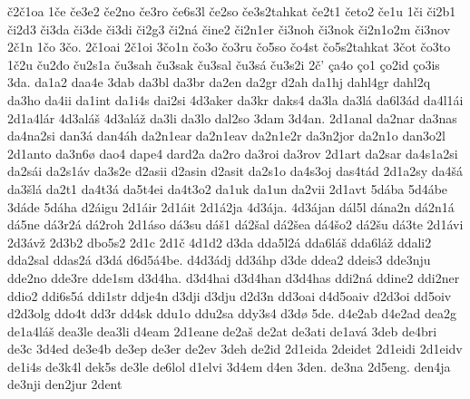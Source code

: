 {    č2č1oa
    1če
    če3e2
    če2no
    če3ro
    če6s3l
    če2so
    če3s2tahkat
    če2t1
    četo2
    če1u
    1či
    či2b1
    či2d3
    či3da
    či3de
    či3di
    či2g3
    či2ná
    čine2
    či2n1er
    či3noh
    či3nok
    či2n1o2m
    či3nov
    2č1n
    1čo
    3čo.
    2č1oai
    2č1oi
    3čo1n
    čo3o
    čo3ru
    čo5so
    čo4st
    čo5s2tahkat
    3čot
    čo3to
    1č2u
    ču2đo
    ču2s1a
    ču3sah
    ču3sak
    ču3sal
    ču3sá
    ču3s2i
    2č'
    ça4o
    ço1
    ço2id
    ço3is
    3da.
    da1a2
    daa4e
    3dab
    da3bl
    da3br
    da2en
    da2gr
    d2ah
    da1hj
    dahl4gr
    dahl2q
    da3ho
    da4ii
    da1int
    da1i4s
    dai2si
    4d3aker
    da3kr
    daks4
    da3la
    da3lá
    da6l3ád
    da4l1ái
    2d1a4lár
    4d3aláš
    4d3aláž
    da3li
    da3lo
    dal2so
    3dam
    3d4an.
    2d1anal
    da2nar
    da3nas
    da4na2si
    dan3á
    dan4áh
    da2n1ear
    da2n1eav
    da2n1e2r
    da3n2jor
    da2n1o
    dan3o2l
    2d1anto
    da3n6ø
    dao4
    dape4
    dard2a
    da2ro
    da3roi
    da3rov
    2d1art
    da2sar
    da4s1a2si
    da2sái
    da2s1áv
    da3s2e
    d2asii
    d2asin
    d2asit
    da2s1o
    da4s3oj
    das4tád
    2d1a2sy
    da4šá
    da3šlá
    da2t1
    da4t3á
    da5t4ei
    da4t3o2
    da1uk
    da1un
    da2vii
    2d1avt
    5dába
    5d4ábe
    3dáde
    5dáha
    d2áigu
    2d1áir
    2d1áit
    2d1á2ja
    4d3ája.
    4d3ájan
    dál5l
    dána2n
    dá2n1á
    dá5ne
    dá3r2á
    dá2roh
    2d1áso
    dá3su
    dáš1
    dá2šal
    dá2šea
    dá4šo2
    dá2šu
    dá3te
    2d1ávi
    2d3ávž
    2d3b2
    dbo5s2
    2d1c
    2d1č
    4d1d2
    d3da
    dda5l2á
    dda6láš
    dda6láž
    ddali2
    dda2sal
    ddas2á
    d3dá
    d6d5á4be.
    d4d3ádj
    dd3áhp
    d3de
    ddea2
    ddeis3
    dde3nju
    dde2no
    dde3re
    dde1sm
    d3d4ha.
    d3d4hai
    d3d4han
    d3d4has
    ddi2ná
    ddine2
    ddi2ner
    ddio2
    ddi6s5á
    ddi1str
    ddje4n
    d3dji
    d3dju
    d2d3n
    dd3oai
    d4d5oaiv
    d2d3oi
    dd5oiv
    d2d3olg
    ddo4t
    dd3r
    dd4sk
    ddu1o
    ddu2sa
    ddy3s4
    d3dø
    5de.
    d4e2ab
    d4e2ad
    dea2g
    de1a4láš
    dea3le
    dea3li
    d4eam
    2d1eane
    de2aš
    de2at
    de3ati
    de1avá
    3deb
    de4bri
    de3c
    3d4ed
    de3e4b
    de3ep
    de3er
    de2ev
    3deh
    de2id
    2d1eida
    2deidet
    2d1eidi
    2d1eidv
    de1i4s
    de3k4l
    dek5s
    de3le
    de6lol
    d1elvi
    3d4em
    d4en
    3den.
    de3na
    2d5eng.
    den4ja
    de3nji
    den2jur
    2dent
}
